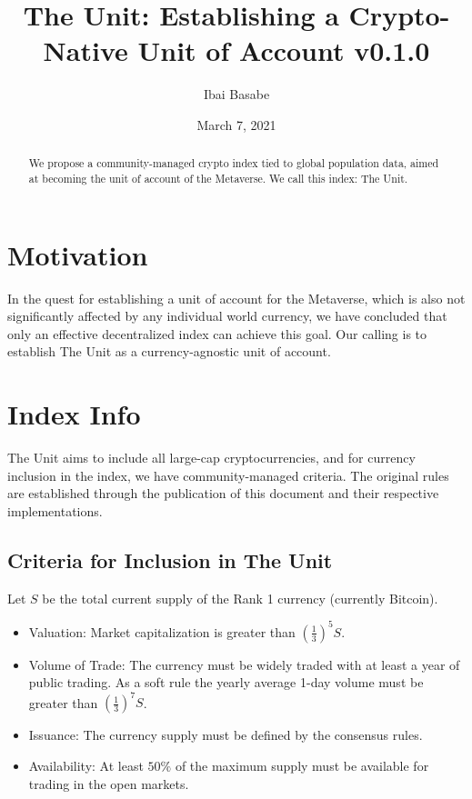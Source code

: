 \documentclass[12pt]{article}
\title{The Unit: Establishing a Crypto-Native Unit of Account v0.1.0}
\author{Ibai Basabe}
\begin{document}
\date{March 7, 2021}

\pagecolor{yellow!15!}

\maketitle


\begin{abstract}
We propose a community-managed crypto index tied to global population data, aimed at becoming the unit of account of the Metaverse. We call this index: The Unit. 
\end{abstract}


\tableofcontents
\newpage

\section{Motivation}

In the quest for establishing a unit of account for the Metaverse, which is also not significantly affected by any individual world currency, we have concluded that only an effective decentralized index can achieve this goal. Our calling is to establish The Unit as a currency-agnostic unit of account. 

\section{Index Info}

The Unit aims to include all large-cap cryptocurrencies, and for currency inclusion in the index, we have community-managed criteria. The original rules are established through the publication of this document and their respective implementations.

\subsection{Criteria for Inclusion in The Unit}

Let $S$ be the total current supply of the Rank 1 currency (currently Bitcoin).

\begin{itemize}

\item Valuation: Market capitalization is greater than $\left(\frac{1}{3}\right)^5 S$.
\item Volume of Trade: The currency must be widely traded with at least a year of public trading. As a soft rule the yearly average 1-day volume must be greater than $\left(\frac{1}{3}\right)^7 S$.
\item Issuance: The currency supply must be defined by the consensus rules.
\item Availability: At least $50\%$ of the maximum supply must be available for trading in the open markets.

\end{itemize}
\end{document}
